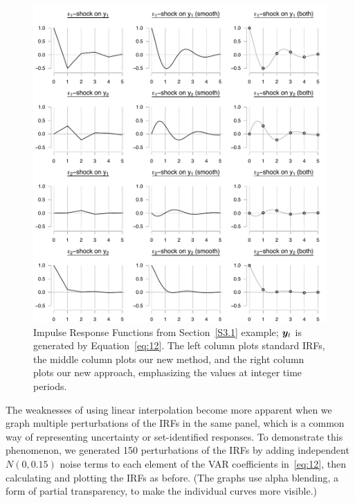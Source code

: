 \documentclass[AER,reviewmode]{tex/AEA}
\begin{document}
\begin{figure}[t]
  \centering
  \includegraphics[width=5.5in]{graphs/numeric.pdf}
  \caption{Impulse Response Functions from Section~\ref{S3.1} example;
    $\bm{y}_t$ is generated by Equation~\eqref{eq:12}. The left column
    plots standard IRFs, the middle column plots our new method, and
    the right column plots our new approach, emphasizing the values at
    integer time periods.}
  \label{fig:3}
\end{figure}

The weaknesses of using linear interpolation become more apparent when
we graph multiple perturbations of the IRFs in the same panel, which
is a common way of representing uncertainty or set-identified
responses. To demonstrate this phenomenon, we generated 150
perturbations of the IRFs by adding independent $N(0, 0.15)$ noise
terms to each element of the VAR coefficients in~\eqref{eq:12}, then
calculating and plotting the IRFs as before. (The graphs use alpha
blending, a form of partial transparency, to make the individual
curves more visible.)
\end{document}
